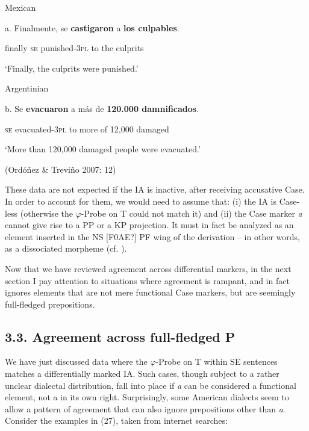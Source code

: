 \documentclass[output=paper]{langsci/langscibook}
\begin{document}
          Mexican 

a.   Finalmente, se  \textbf{castigaron}       a  \textbf{los culpables}.        

      finally         \textsc{se}   punished-\textsc{3pl}   to the culprits

‘Finally, the culprits were punished.’

  Argentinian 

b.   Se  \textbf{evacuaron}    a más de \textbf{120.000 damnificados}.              

        \textsc{se}   evacuated-\textsc{3pl} to more of 12,000 damaged

                  ‘More than 120,000 damaged people were evacuated.’

(Ordóñez \& Treviño 2007: 12)

These data are not expected if the IA is inactive, after receiving accusative Case. In order to account for them, we would need to assume that: (i) the IA is Case-less (otherwise the $\varphi $-Probe on T could not match it) and (ii) the Case marker \textit{a} cannot give rise to a PP or a KP projection. It must in fact be analyzed as an element inserted in the NS [F0AE?] PF wing of the derivation – in other words, as a dissociated morpheme (cf. \citet{Halle1993}).

  Now that we have reviewed agreement across differential markers, in the next section I pay attention to situations where agreement is rampant, and in fact ignores elements that are not mere functional Case markers, but are seemingly full-fledged prepositions.

\subsection{ 3.3. Agreement across full-fledged P}

We have just discussed data where the $\varphi $-Probe on T within SE sentences matches a differentially marked IA. Such cases, though subject to a rather unclear dialectal distribution, fall into place if  \textit{a} can be considered a functional element, not a  in its own right. Surprisingly, some American  dialects seem to allow a pattern of agreement that can also ignore prepositions other than \textit{a}. Consider the examples in (27), taken from internet searches:

\ea%
    \label{ex:key:27}
    \gll\\
        \\
    \glt
    \z
\end{document}

